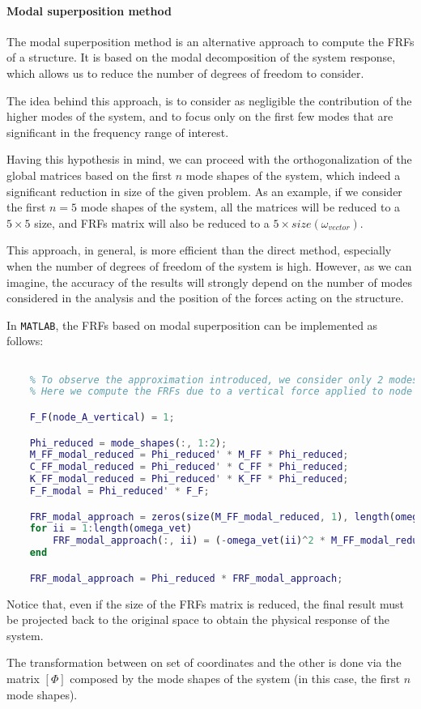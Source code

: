 \paragraph{Modal superposition method}

The modal superposition method is an alternative approach to compute the FRFs of a structure.
It is based on the modal decomposition of the system response, which allows us to reduce the number of degrees of freedom to consider.

The idea behind this approach, is to consider as negligible the contribution of the higher modes of the system, and to focus only on the first few modes that are significant in the frequency range of interest.

Having this hypothesis in mind, we can proceed with the orthogonalization of the global matrices based on the first $n$ mode shapes of the system, which indeed a significant reduction in size of the given problem.
As an example, if we consider the first $n=5$ mode shapes of the system, all the matrices will be reduced to a $5 \times 5$ size, and FRFs matrix will also be reduced to a $5 \times size(\omega_{vector})$.

This approach, in general, is more efficient than the direct method, especially when the number of degrees of freedom of the system is high.
However, as we can imagine, the accuracy of the results will strongly depend on the number of modes considered in the analysis and the position of the forces acting on the structure.

In \texttt{MATLAB}, the FRFs based on modal superposition can be implemented as follows:

\begin{lstlisting}[language=Matlab]

    % To observe the approximation introduced, we consider only 2 modes
    % Here we compute the FRFs due to a vertical force applied to node A with module 1

    F_F(node_A_vertical) = 1;

    Phi_reduced = mode_shapes(:, 1:2);
    M_FF_modal_reduced = Phi_reduced' * M_FF * Phi_reduced;
    C_FF_modal_reduced = Phi_reduced' * C_FF * Phi_reduced;
    K_FF_modal_reduced = Phi_reduced' * K_FF * Phi_reduced;
    F_F_modal = Phi_reduced' * F_F;

    FRF_modal_approach = zeros(size(M_FF_modal_reduced, 1), length(omega_vet));
    for ii = 1:length(omega_vet)
        FRF_modal_approach(:, ii) = (-omega_vet(ii)^2 * M_FF_modal_reduced + 1i*omega_vet(ii) * C_FF_modal_reduced + K_FF_modal_reduced) \ F_F_modal;
    end

    FRF_modal_approach = Phi_reduced * FRF_modal_approach;

\end{lstlisting}

Notice that, even if the size of the FRFs matrix is reduced, the final result must be projected back to the original space to obtain the physical response of the system.

The transformation between on set of coordinates and the other is done via the matrix $[\Phi]$ composed by the mode shapes of the system (in this case, the first $n$ mode shapes).
